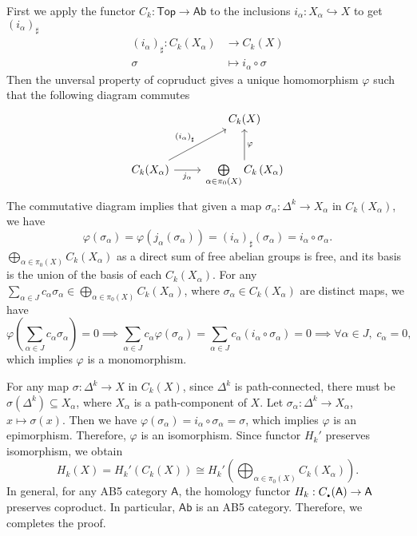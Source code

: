 \documentclass{report}
\begin{document}
\begin{prf}
	First we apply the functor $C_k:\mathsf{Top}\to\mathsf{Ab}$ to the inclusions $i_\alpha:X_\alpha \hookrightarrow X$ to get $\left(i_\alpha\right)_\sharp$
	\begin{align*}
		\left(i_\alpha\right)_\sharp: C_k(X_\alpha)&\longrightarrow C_k(X)\\
                   \sigma &\longmapsto i_\alpha\circ \sigma
	\end{align*}
	Then the unversal property of copruduct gives a unique homomorphism $\varphi$ such that the following diagram commutes
	\begin{equation*}
		\begin{tikzcd}[ampersand replacement=\&]		
			\& C_{k}(X) \\ [10pt]
			C_{k}(X_\alpha) \arrow[ru, "\left(i_\alpha \right)_{\sharp}"] \arrow[r, "j_\alpha"']
			\& \bigoplus\limits_{\alpha\in \pi_0(X)} C_k\left(X_\alpha\right) \arrow[u, "\varphi"'] 
		\end{tikzcd}			
	\end{equation*}
	The commutative diagram implies that given a map $\sigma_\alpha:\Delta^k\to X_\alpha$ in $C_k(X_\alpha)$, we have
	\[
		\varphi(\sigma_\alpha)=\varphi(j_\alpha(\sigma_\alpha))=\left(i_\alpha\right)_\sharp(\sigma_\alpha)=i_\alpha\circ\sigma_\alpha.
	\]
	$\bigoplus\limits_{\alpha\in \pi_0(X)} C_k\left(X_\alpha\right)$ as a direct sum of free abelian groups is free, and its basis is the union of the basis of each $C_k\left(X_\alpha\right)$. 
	For any $\sum\limits_{\alpha\in J}c_\alpha\sigma_\alpha\in \bigoplus\limits_{\alpha\in \pi_0(X)} C_k\left(X_\alpha\right)$, where $\sigma_\alpha\in C_k\left(X_\alpha\right)$ are distinct maps, we have
	\[
		\varphi\left(\sum\limits_{\alpha\in J}c_\alpha\sigma_\alpha\right)=0\implies \sum_{\alpha\in J}c_\alpha\varphi\left(\sigma_\alpha\right)=\sum_{\alpha\in J} c_\alpha \left(i_\alpha\circ\sigma_\alpha\right)=0\implies \forall \alpha\in J,\;c_\alpha=0,
	\]
	which implies $\varphi$ is a monomorphism. 

	For any map $\sigma:\Delta^k\to X$ in $C_k(X)$, since $\Delta^k$ is path-connected, there must be $\sigma(\Delta^k)\subseteq X_\alpha$, where $X_\alpha$ is a path-component of $X$. Let $\sigma_\alpha:\Delta^k\to X_\alpha$, $x\mapsto\sigma(x)$. Then we have $\varphi(\sigma_\alpha)=i_\alpha\circ\sigma_\alpha=\sigma$, which implies $\varphi$ is an epimorphism. Therefore, $\varphi$ is an isomorphism. Since functor $H_k'$ preserves isomorphism, we obtain
	$$
	H_k(X)=H_k'(C_k(X))\cong H_k'\left(\bigoplus_{\alpha\in \pi_0(X)} C_k\left(X_\alpha\right)\right).
	$$ 
	In general, for any AB5 category $\mathsf{A}$, the homology functor $H_k:C_\text{\hspace{-1pt}\huge$.$\hspace{-1pt}}(\mathsf{A})\to \mathsf{A}$ preserves coproduct. In particular, $\mathsf{Ab}$ is an AB5 category. Therefore, we completes the proof.
\end{prf}
\end{document}
